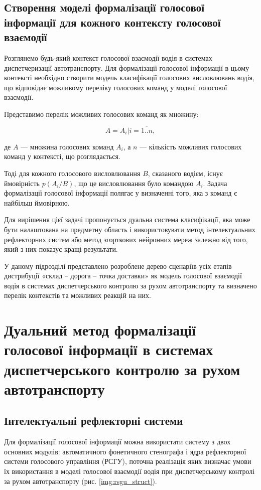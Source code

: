 \subsection{Створення моделі формалізації голосової інформації для кожного контексту голосової взаємодії}

Розглянемо будь-який контекст голосової взаємодії водія в системах диспетчеризації автотранспорту. Для формалізації голосової інформації в цьому контексті необхідно створити модель класифікації голосових висловлювань водія, що відповідає можливому переліку голосових команд у моделі голосової взаємодії.

Представимо перелік можливих голосових команд як множину:

\[
A = {A_i | i=\overline{1..n}},
\]

\noindent
де $A$ --- множина голосових команд $A_i$, а $n$ --- кількість можливих голосових команд у контексті, що розглядається.

Тоді для кожного голосового висловлювання $B$, сказаного водієм, існує ймовірність $p(A_i/B)$, що це висловлювання було командою $A_i$. Задача формалізації голосової інформації полягає у визначенні того, яка з команд є найбільш ймовірною.

Для вирішення цієї задачі пропонується дуальна система класифікації, яка може бути налаштована на предметну область і використовувати метод інтелектуальних рефлекторних систем або метод згорткових нейронних мереж залежно від того, який з них показує кращі результати.

У даному підрозділі представлено розроблене дерево сценаріїв усіх етапів дистрибуції «склад – дорога – точка доставки» як модель голосової взаємодії водія в системах диспетчерського контролю за рухом автотранспорту та визначено перелік контекстів та можливих реакцій на них.

\section{Дуальний метод формалізації голосової інформації в системах диспетчерського контролю за рухом автотранспорту} \label{sect3_4}

\subsection{Інтелектуальні рефлекторні системи}

Для формалізації голосової інформації можна використати систему з двох основних модулів: автоматичного фонетичного стенографа і ядра рефлекторної системи голосового управління (РСГУ), поточна реалізація яких визначає умови їх використання в моделі голосової взаємодії водія при диспетчерському контролі за рухом автотранспорту (рис. \ref{img:rsgu_struct}).

